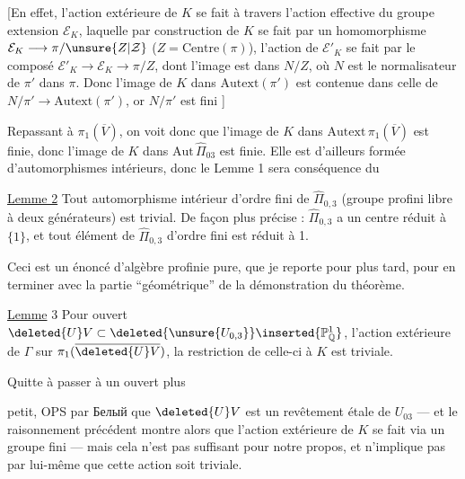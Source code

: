 
[En effet, l'action extérieure de $K$ se fait à travers l'action effective du groupe extension $\mathcal E_K$, laquelle par construction de $K$ se fait par un homomorphisme $\mathcal E_K\longrightarrow\pi/\unsure{Z|\mathcal Z}$ ($Z=\mathrm{Centre}(\pi)$),  l'action de $\mathcal E'_K$  se fait par le composé $\mathcal E'_K\longrightarrow\mathcal E_K\longrightarrow\pi/Z$, dont l'image est dans $N/Z$, où $N$ est le normalisateur de $\pi'$ dans $\pi$. Donc l'image de $K$ dans $\mathrm{Autext}(\pi')$ est contenue dans celle de $N/\pi'\longrightarrow\mathrm{Autext}(\pi')$, or $N/\pi'$ est fini ]


Repassant à $\pi_1(\overline V)$, on voit donc que l'image de $K$ dans $\mathrm{Autext}\,\pi_1(\overline V)$ est finie, donc l'image de $K$ dans $\mathrm{Aut}\,\widehat{\Pi}_{03}$ est finie. Elle est d'ailleurs formée d'automorphismes intérieurs, donc le Lemme 1 sera conséquence du

\uline{Lemme 2} Tout automorphisme intérieur d'ordre fini de $\widehat{\Pi}_{0,3}$ (groupe profini libre à deux générateurs) est trivial. De façon plus précise : $\widehat{\Pi}_{0,3}$ a un centre réduit à $\{1\}$, et tout élément de $\widehat{\Pi}_{0,3}$ d'ordre fini est réduit à 1.

Ceci est un énoncé d'algèbre profinie pure, que je reporte pour plus tard, pour en terminer avec la partie ``géométrique'' de la démonstration du théorème.

\uline{Lemme} 3 Pour  ouvert  $\deleted{U}V\subset\deleted{\unsure{U_{0,3}}}\inserted{\mathbb P^1_{\mathbb Q}}$,  l'action extérieure de $\Gamma$ sur $\pi_1(\overline{\deleted{U}V})$, la restriction de celle-ci à $K$ est triviale.

Quitte à passer à un ouvert plus


petit, OPS par Белый que $\deleted{U}V$ est un revêtement étale de $U_{03}$ --- et le raisonnement précédent montre alors que l'action extérieure de $K$ se fait via un groupe  fini --- mais cela n'est pas suffisant pour notre propos, et n'implique pas par lui-même que cette action soit triviale.

